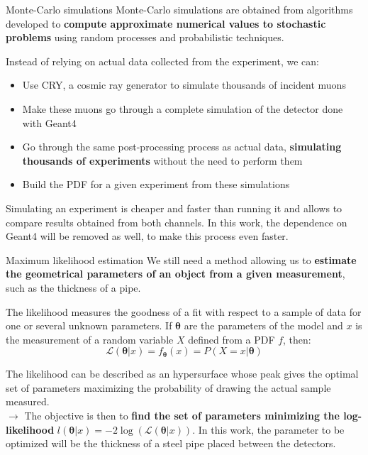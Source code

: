 \documentclass[8 pt]{beamer}
\begin{document}
\begin{frame}{Monte-Carlo simulations}
\justifying
Monte-Carlo simulations are obtained from algorithms developed to \textbf{compute approximate numerical values to stochastic problems} using random processes and probabilistic techniques. \vfill

Instead of relying on actual data collected from the experiment, we can:
\begin{itemize}
\justifying
\item Use CRY, a cosmic ray generator to simulate thousands of incident muons
\item Make these muons go through a complete simulation of the detector done with Geant4
\item Go through the same post-processing process as actual data, \textbf{simulating thousands of experiments} without the need to perform them
\item Build the PDF for a given experiment from these simulations
\end{itemize} \vfill

Simulating an experiment is cheaper and faster than running it and allows to compare results obtained from both channels. In this work, the dependence on Geant4 will be removed as well, to make this process even faster. \vfill
\end{frame}

\begin{frame}{Maximum likelihood estimation}
\justifying
We still need a method allowing us to \textbf{estimate the geometrical parameters of an object from a given measurement}, such as the thickness of a pipe. \vfill

The likelihood measures the goodness of a fit with respect to a sample of data for one or several unknown parameters. If $\bm \theta$ are the parameters of the model and $x$ is the measurement of a random variable $X$ defined from a PDF $f$, then:
\begin{equation*}
\label{eq:likelihood}
\mathcal{L}(\bm \theta | x) = f_{\bm \theta}(x) = P(X = x | \bm \theta)
\end{equation*} \vfill

The likelihood can be described as an hypersurface whose peak gives the optimal set of parameters maximizing the probability of drawing the actual sample measured. \\ \vspace{5pt}
\hspace{10pt} $\rightarrow$ The objective is then to \textbf{find the set of parameters minimizing the log-likelihood} $l(\bm \theta | x) = -2 \log(\mathcal{L}(\bm \theta | x))$. In this work, the parameter to be optimized will be the thickness of a steel pipe placed between the detectors. \vfill
\end{frame}
\end{document}
